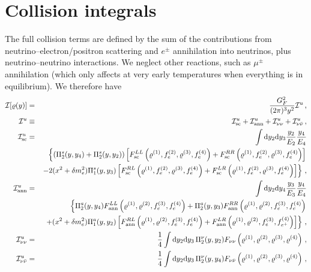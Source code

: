 \documentclass[notitlepage,showpacs,preprintnumbers,amsmath,amssymb,superscriptaddress,prd,onecolumn]{revtex4-1}
\begin{document}
\section{Collision integrals}
\label{sec:collint}
The full collision terms are defined by the sum
of the contributions from neutrino--electron/positron scattering and
$e^\pm$ annihilation into neutrinos,
plus neutrino--neutrino interactions.
We neglect other reactions, such as $\mu^\pm$ annihilation (which only affects at very early temperatures when everything is in equilibrium).
We therefore have \cite{deSalas:2016ztq,Bennett:inprep}
%
\begin{eqnarray}
\mathcal{I}[\varrho(y)]
&=&
\frac{G_F^2}{(2\pi)^3y^2}
\mathcal{I}^u\,,
\label{eq:collint}
\\
\mathcal{I}^u
&\equiv&
\mathcal{I}_{\rm sc}^u
+ \mathcal{I}_{\rm ann}^u
+ \mathcal{I}_{\nu\nu}^u
+ \mathcal{I}_{\nu\bar\nu}^u
\,,
\label{eq:unnormcollint}
\\
\mathcal{I}_{\rm sc} ^u
&=&
\int {\rm d}y_2 {\rm d}y_3 \frac{y_2}{E_2} \frac{y_4}{E_4}
\label{eq:I_sc}
\\
&&
\left\{\left(\Pi_2^s(y, y_4)+\Pi_2^s(y, y_2)\right)
    \left[
    F_{\rm sc}^{LL}\left(\varrho^{(1)}, f_e^{(2)}, \varrho^{(3)}, f_e^{(4)}\right)
    +F_{\rm sc}^{RR}\left(\varrho^{(1)}, f_e^{(2)}, \varrho^{(3)}, f_e^{(4)}\right)\right]\right.
    \nonumber\\
    &&\left.-2(x^2+\delta m_e^2)\Pi_1^s(y,y_3)
    \left[
     F_{\rm sc}^{RL}\left(\varrho^{(1)}, f_e^{(2)}, \varrho^{(3)}, f_e^{(4)}\right)
    +F_{\rm sc}^{LR}\left(\varrho^{(1)}, f_e^{(2)}, \varrho^{(3)}, f_e^{(4)}\right)
    \right]\nonumber
\right\}\,,
\\
\mathcal{I}_{\rm ann}^u
&=&
\int {\rm d}y_2 {\rm d}y_4 \frac{y_3}{E_3} \frac{y_4}{E_4}
\label{eq:I_ann}\\
    &&\left\{\Pi_2^a(y, y_4)F_{\rm ann}^{LL}\left(\varrho^{(1)}, \varrho^{(2)}, f_e^{(3)}, f_e^{(4)}\right)
    +\Pi_2^a(y, y_3)F_{\rm ann}^{RR}\left(\varrho^{(1)}, \varrho^{(2)}, f_e^{(3)}, f_e^{(4)}\right)\right.
\nonumber\\
    &&\left.+ (x^2+\delta m_e^2)\Pi_1^a(y,y_2)
    \left[
    F_{\rm ann}^{RL}\left(\varrho^{(1)}, \varrho^{(2)}, f_e^{(3)}, f_e^{(4)}\right)
    +F_{\rm ann}^{LR}\left(\varrho^{(1)}, \varrho^{(2)}, f_e^{(3)}, f_{e^+}^{(4)}\right)
    \right]\nonumber
\right\}\,,
\\
\mathcal{I}_{\nu\nu} ^u
&=&
\frac{1}{4}
\int {\rm d}y_2 {\rm d}y_3\,
\Pi_2^\nu(y, y_2)
F_{\nu\nu}\left(\varrho^{(1)}, \varrho^{(2)}, \varrho^{(3)}, \varrho^{(4)}\right)
\,,
\label{eq:I_nunu}
\\
\mathcal{I}_{\nu\bar\nu} ^u
&=&
\frac{1}{4}
\int {\rm d}y_2 {\rm d}y_3\,
\Pi_2^\nu(y, y_4)
F_{\nu\bar\nu}\left(\varrho^{(1)}, \varrho^{(2)}, \varrho^{(3)}, \varrho^{(4)}\right)
\label{eq:I_nubarnu}
\,,
\end{eqnarray}
\end{document}
